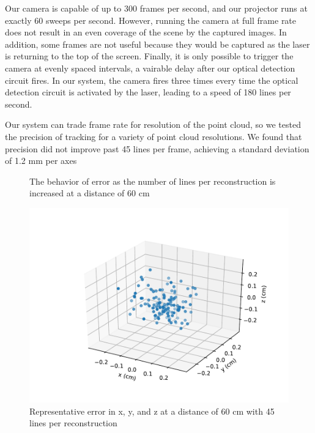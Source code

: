 \documentclass{llncs}
\begin{document}
Our camera is capable of up to 300 frames per second, and our projector runs at exactly 60 sweeps per second. However, running the camera at full frame rate does not result in an even coverage of the scene by the captured images. In addition, some frames are not useful because they would be captured as the laser is returning to the top of the screen. Finally, it is only possible to trigger the camera at evenly spaced intervals, a vairable delay after our optical detection circuit fires. In our system, the camera fires three times every time the optical detection circuit is activated by the laser, leading to a speed of 180 lines per second.

Our system can trade frame rate for resolution of the point cloud, so we tested the precision of tracking for a variety of point cloud resolutions. We found that precision did not improve past 45 lines per frame, achieving a standard deviation of 1.2 mm per axes
\begin{figure}
\caption{The behavior of error as the number of lines per reconstruction is increased at a distance of 60 cm}
\end{figure}
\begin{figure}
\includegraphics[scale=.7]{45_lines_error}
\caption{Representative error in x, y, and z at a distance of 60 cm with 45 lines per reconstruction}
\end{figure}
\end{document}
